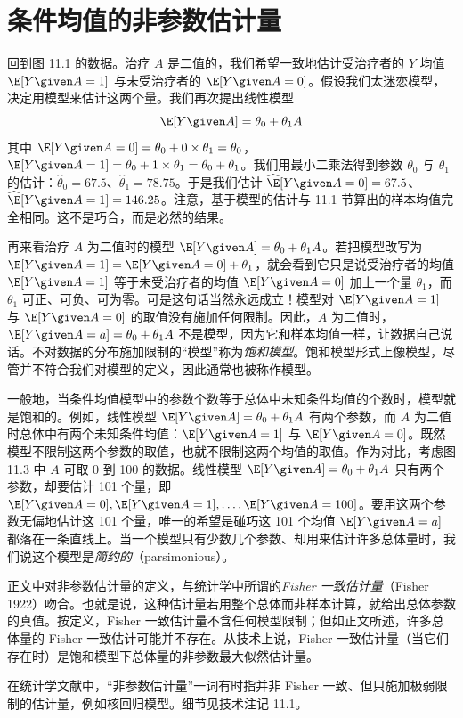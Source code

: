 \section{条件均值的非参数估计量}

回到图 11.1 的数据。治疗 $A$ 是二值的，我们希望一致地估计受治疗者的 $Y$ 均值 $\E[Y\given A=1]$ 与未受治疗者的 $\E[Y\given A=0]$。假设我们太迷恋模型，决定用模型来估计这两个量。我们再次提出线性模型
\[
\E[Y\given A]=\theta_0+\theta_1 A
\]
其中 $\E[Y\given A=0]=\theta_0+0\times\theta_1=\theta_0$，$\E[Y\given A=1]=\theta_0+1\times\theta_1=\theta_0+\theta_1$。我们用最小二乘法得到参数 $\theta_0$ 与 $\theta_1$ 的估计：$\hat\theta_0=67.5$、$\hat\theta_1=78.75$。于是我们估计 $\widehat{\E}[Y\given A=0]=67.5$、$\widehat{\E}[Y\given A=1]=146.25$。注意，基于模型的估计与 11.1 节算出的样本均值完全相同。这不是巧合，而是必然的结果。


再来看治疗 $A$ 为二值时的模型 $\E[Y\given A]=\theta_0+\theta_1 A$。若把模型改写为 $\E[Y\given A=1]=\E[Y\given A=0]+\theta_1$，就会看到它只是说受治疗者的均值 $\E[Y\given A=1]$ 等于未受治疗者的均值 $\E[Y\given A=0]$ 加上一个量 $\theta_1$，而 $\theta_1$ 可正、可负、可为零。可是这句话当然永远成立！模型对 $\E[Y\given A=1]$ 与 $\E[Y\given A=0]$ 的取值没有施加任何限制。因此，$A$ 为二值时，$\E[Y\given A=a]=\theta_0+\theta_1 A$ 不是模型，因为它和样本均值一样，让数据自己说话。不对数据的分布施加限制的“模型”称为\emph{饱和模型}。饱和模型形式上像模型，尽管并不符合我们对模型的定义，因此通常也被称作模型。

一般地，当条件均值模型中的参数个数等于总体中未知条件均值的个数时，模型就是饱和的。例如，线性模型 $\E[Y\given A]=\theta_0+\theta_1 A$ 有两个参数，而 $A$ 为二值时总体中有两个未知条件均值：$\E[Y\given A=1]$ 与 $\E[Y\given A=0]$。既然模型不限制这两个参数的取值，也就不限制这两个均值的取值。作为对比，考虑图 11.3 中 $A$ 可取 0 到 100 的数据。线性模型 $\E[Y\given A]=\theta_0+\theta_1 A$ 只有两个参数，却要估计 101 个量，即 $\E[Y\given A=0],\E[Y\given A=1],\dots,\E[Y\given A=100]$。要用这两个参数无偏地估计这 101 个量，唯一的希望是碰巧这 101 个均值 $\E[Y\given A=a]$ 都落在一条直线上。当一个模型只有少数几个参数、却用来估计许多总体量时，我们说这个模型是\emph{简约的}（parsimonious）。

\begin{finepoint}
正文中对非参数估计量的定义，与统计学中所谓的\emph{Fisher 一致估计量}（Fisher 1922）吻合。也就是说，这种估计量若用整个总体而非样本计算，就给出总体参数的真值。按定义，Fisher 一致估计量不含任何模型限制；但如正文所述，许多总体量的 Fisher 一致估计可能并不存在。从技术上说，Fisher 一致估计量（当它们存在时）是饱和模型下总体量的非参数最大似然估计量。

在统计学文献中，“非参数估计量”一词有时指并非 Fisher 一致、但只施加极弱限制的估计量，例如核回归模型。细节见技术注记 11.1。
\end{finepoint}

